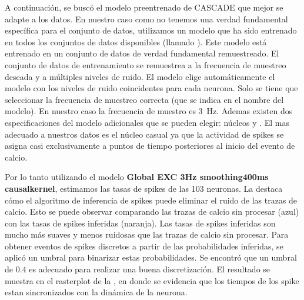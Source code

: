 A continuación, se buscó    el modelo preentrenado  de CASCADE que mejor se adapte a los datos. En nuestro caso como no tenemos una verdad fundamental específica para el conjunto de datos,  utilizamos un modelo que ha sido entrenado en todos los conjuntos de datos disponibles (llamado ).   Este modelo está entrenado en un conjunto de datos de verdad fundamental remuestreado. El conjunto de datos de entrenamiento se remuestrea a la frecuencia de muestreo deseada y a múltiples niveles de ruido. El modelo elige automáticamente el modelo con los niveles de ruido coincidentes para cada neurona. Solo se tiene  que seleccionar la frecuencia de muestreo correcta (que se indica en el nombre del modelo). En nuestro caso la frecuencia de muestro es \qty{3}{\hertz}.  Ademas existen  dos especificaciones del modelo adicionales que se pueden elegir: núcleos  y .  El mas adecuado a nuestros datos es el núcleo casual ya que   la actividad de spikes se asigna casi exclusivamente a puntos de tiempo posteriores al inicio del evento de calcio. 

Por lo tanto utilizando el modelo   \textbf{ Global EXC 3Hz smoothing400ms causalkernel}, estimamos las tasas de spikes  de las 103 neuronas. La  destaca cómo el algoritmo de inferencia de spikes puede eliminar el ruido de las trazas de calcio. Esto se puede observar comparando las trazas de calcio sin procesar (azul) con las tasas de spikes inferidas (naranja). Las tasas de spikes inferidas son mucho más suaves y menos ruidosas que las trazas de calcio sin procesar. Para obtener eventos de spikes discretos a partir de las probabilidades inferidas, se aplicó un umbral para binarizar estas probabilidades. Se encontró que un umbral de $0.4$ es adecuado para realizar una buena discretización. El resultado se muestra en el rasterplot de la , en donde se evidencia que los tiempos de los spike  estan sincronizados con  la dinámica de la neurona.

